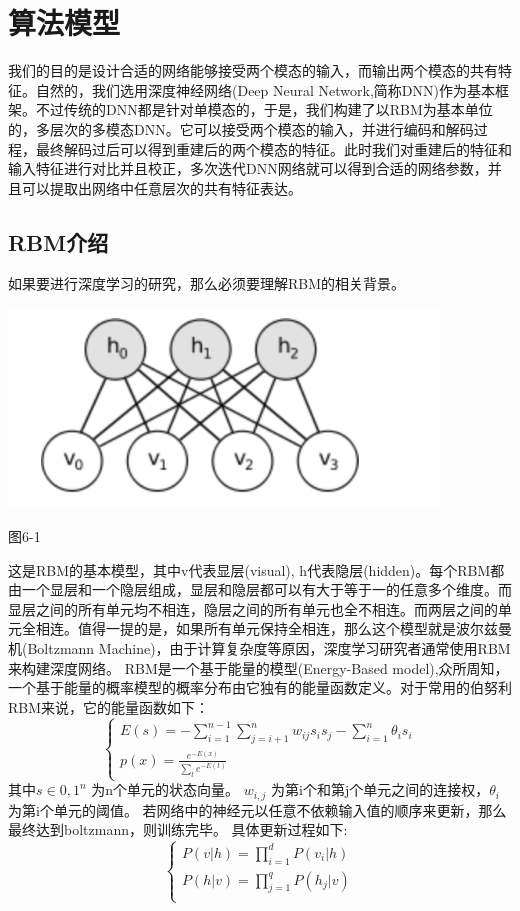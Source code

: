 \section{算法模型}
	我们的目的是设计合适的网络能够接受两个模态的输入，而输出两个模态的共有特征。自然的，我们选用深度神经网络(Deep Neural Network,简称DNN)作为基本框架。不过传统的DNN都是针对单模态的，于是，我们构建了以RBM为基本单位的，多层次的多模态DNN。它可以接受两个模态的输入，并进行编码和解码过程，最终解码过后可以得到重建后的两个模态的特征。此时我们对重建后的特征和输入特征进行对比并且校正，多次迭代DNN网络就可以得到合适的网络参数，并且可以提取出网络中任意层次的共有特征表达。
	\subsection{RBM介绍}
	如果要进行深度学习的研究，那么必须要理解RBM的相关背景。\\
	\par
	\centerline{\includegraphics[width=4.5in]{figure/rbm.png}} %
	\centerline{图6-1}

	这是RBM的基本模型，其中v代表显层(visual), h代表隐层(hidden)。每个RBM都由一个显层和一个隐层组成，显层和隐层都可以有大于等于一的任意多个维度。而显层之间的所有单元均不相连，隐层之间的所有单元也全不相连。而两层之间的单元全相连。值得一提的是，如果所有单元保持全相连，那么这个模型就是波尔兹曼机(Boltzmann Machine)，由于计算复杂度等原因，深度学习研究者通常使用RBM来构建深度网络。
	RBM是一个基于能量的模型(Energy-Based model),众所周知，一个基于能量的概率模型的概率分布由它独有的能量函数定义。对于常用的伯努利RBM来说，它的能量函数如下：
	\begin{equation}
	\begin{cases}
	E(s) = -\sum\limits_{i=1}^{n-1}\sum\limits_{j = i + 1}^{n} w_{ij}s_is_j - \sum\limits_{i=1}^n \theta_i s_i \\
	p(x) = \frac{e^{-E(x)}}{\sum\limits_t e^{-E(t)}}
	\end{cases}
	\end{equation}
	其中$s \in {0, 1}^n$  为n个单元的状态向量。 $w_{i, j}$ 为第i个和第j个单元之间的连接权，$\theta_i$为第i个单元的阈值。
	若网络中的神经元以任意不依赖输入值的顺序来更新，那么最终达到boltzmann，则训练完毕。
	具体更新过程如下:
	\begin{equation}
	\begin{cases}
	P(v|h) = \prod\limits_{i=1}^d P(v_i |h)\\
	P(h|v) = \prod\limits_{j=1}^q P(h_j |v)\\
	\end{cases}
	\end{equation}
	
